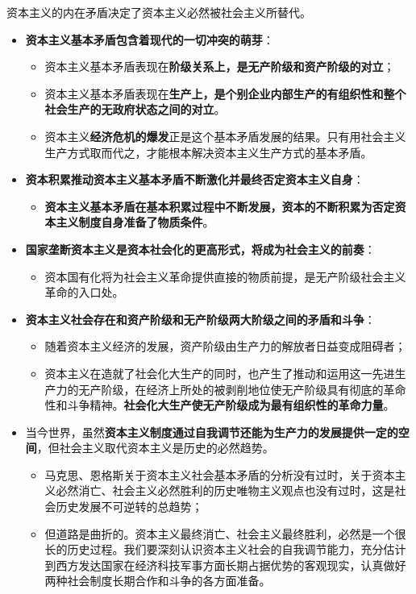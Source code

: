 \documentclass[
]{article}
\begin{document}
资本主义的内在矛盾决定了资本主义必然被社会主义所替代。

\begin{itemize}
\item
  \textbf{资本主义基本矛盾包含着现代的一切冲突的萌芽}：

  \begin{itemize}
  \item
    资本主义基本矛盾表现在\textbf{阶级关系上，是无产阶级和资产阶级的对立}；
  \item
    资本主义基本矛盾表现在\textbf{生产上，是个别企业内部生产的有组织性和整个社会生产的无政府状态之间的对立}。
  \item
    资本主义\textbf{经济危机的爆发}正是这个基本矛盾发展的结果。只有用社会主义生产方式取而代之，才能根本解决资本主义生产方式的基本矛盾。
  \end{itemize}
\item
  \textbf{资本积累推动资本主义基本矛盾不断激化并最终否定资本主义自身}：

  \begin{itemize}
  \item
    \textbf{资本主义基本矛盾在基本积累过程中不断发展，资本的不断积累为否定资本主义制度自身准备了物质条件}。
  \end{itemize}
\item
  \textbf{国家垄断资本主义是资本社会化的更高形式，将成为社会主义的前奏}：

  \begin{itemize}
  \item
    资本国有化将为社会主义革命提供直接的物质前提，是无产阶级社会主义革命的入口处。
  \end{itemize}
\item
  \textbf{资本主义社会存在和资产阶级和无产阶级两大阶级之间的矛盾和斗争}：

  \begin{itemize}
  \item
    随着资本主义经济的发展，资产阶级由生产力的解放者日益变成阻碍者；
  \item
    资本主义在造就了社会化大生产的同时，也产生了推动和运用这一先进生产力的无产阶级，在经济上所处的被剥削地位使无产阶级具有彻底的革命性和斗争精神。\textbf{社会化大生产使无产阶级成为最有组织性的革命力量}。
  \end{itemize}
\item
  当今世界，虽然\textbf{资本主义制度通过自我调节还能为生产力的发展提供一定的空间}，但社会主义取代资本主义是历史的必然趋势。

  \begin{itemize}
  \item
    马克思、恩格斯关于资本主义社会基本矛盾的分析没有过时，关于资本主义必然消亡、社会主义必然胜利的历史唯物主义观点也没有过时，这是社会历史发展不可逆转的总趋势；
  \item
    但道路是曲折的。资本主义最终消亡、社会主义最终胜利，必然是一个很长的历史过程。我们要深刻认识资本主义社会的自我调节能力，充分估计到西方发达国家在经济科技军事方面长期占据优势的客观现实，认真做好两种社会制度长期合作和斗争的各方面准备。
  \end{itemize}
\end{itemize}
\end{document}

